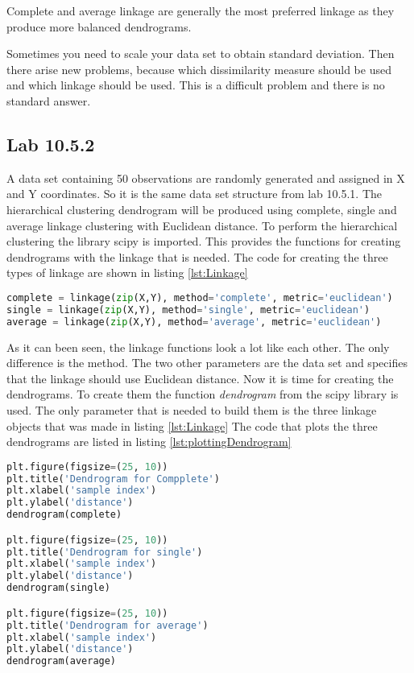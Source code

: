 Complete and average linkage are generally the most preferred linkage as they produce more balanced dendrograms. 

Sometimes you need to scale your data set to obtain standard deviation. Then there arise new problems, because which dissimilarity measure should be used and which linkage should be used. This is a difficult problem and there is no standard answer.

\subsection{Lab 10.5.2}
A data set containing 50 observations are randomly generated and assigned in X and Y coordinates. So it is the same data set structure from lab 10.5.1.
The hierarchical clustering dendrogram will be produced using complete, single and average linkage clustering with Euclidean distance.
To perform the hierarchical clustering the library scipy is imported. This provides the functions for creating dendrograms with the linkage that is needed. 
The code for creating the three types of linkage are shown in listing
\ref{lst:Linkage}

\begin{lstlisting}[language=Python, label=lst:Linkage, caption=The code that apllies the three different linkage on the data set]
complete = linkage(zip(X,Y), method='complete', metric='euclidean')
single = linkage(zip(X,Y), method='single', metric='euclidean') 
average = linkage(zip(X,Y), method='average', metric='euclidean')
\end{lstlisting}

As it can been seen, the linkage functions look a lot like each other. The only difference is the method. The two other parameters are the data set and specifies that the linkage should use Euclidean distance. 
Now it is time for creating the dendrograms. To create them the function \emph{dendrogram} from the scipy library is used. The only parameter that is needed to build them is the three linkage objects that was made in listing \ref{lst:Linkage}
The code that plots the three dendrograms are listed in listing \ref{lst:plottingDendrogram}

\begin{lstlisting}[language=Python, label=lst:plottingDendrogram, caption=The python code that plots the dendrograms for the three different linakge]
plt.figure(figsize=(25, 10))
plt.title('Dendrogram for Compplete')
plt.xlabel('sample index')
plt.ylabel('distance')
dendrogram(complete)

plt.figure(figsize=(25, 10))
plt.title('Dendrogram for single')
plt.xlabel('sample index')
plt.ylabel('distance')
dendrogram(single)

plt.figure(figsize=(25, 10))
plt.title('Dendrogram for average')
plt.xlabel('sample index')
plt.ylabel('distance')
dendrogram(average)
\end{lstlisting}

